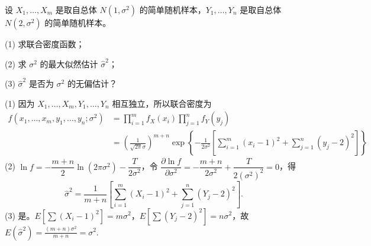 \documentclass[lang=cn,11pt]{elegantbook}
\begin{document}
\begin{exercise}\label{exer:7-two-normal-mle}
设 \(X_1, \dots, X_m\) 是取自总体 \(N(1, \sigma^2)\) 的简单随机样本，\(Y_1, \dots, Y_n\) 是取自总体 \(N(2, \sigma^2)\) 的简单随机样本。\par
(1) 求联合密度函数；\par
(2) 求 \(\sigma^2\) 的最大似然估计 \(\hat{\sigma}^2\)；\par
(3) \(\hat{\sigma}^2\) 是否为 \(\sigma^2\) 的无偏估计？
\end{exercise}
\begin{solution}
(1) 因为 \(X_1,\dots,X_m,Y_1,\dots,Y_n\) 相互独立，所以联合密度为
\[
\begin{aligned}
f(x_1,\dots,x_m,y_1,\dots,y_n;\sigma^2)
&=\prod_{i=1}^m f_X(x_i)\prod_{j=1}^n f_Y(y_j)\\
&=\left(\frac1{\sqrt{2\pi}\sigma}\right)^{m+n}
\exp\left\{-\frac{1}{2\sigma^2}
\left[\sum_{i=1}^m(x_i-1)^2+\sum_{j=1}^n(y_j-2)^2\right]\right\}
\end{aligned}
\]
(2) \(\ln f = -\dfrac{m+n}{2}\ln(2\pi\sigma^2) - \dfrac{T}{2\sigma^2}\)，令 \(\dfrac{\partial\ln f}{\partial\sigma^2} = -\dfrac{m+n}{2\sigma^2}+\dfrac{T}{2(\sigma^2)^2}=0\)，得
\[
\hat{\sigma}^2 = \frac{1}{m+n}\!\left[\sum_{i=1}^{m}(X_i-1)^2+\sum_{j=1}^{n}(Y_j-2)^2\right].
\]
(3) 是。\(E\!\left[\sum(X_i-1)^2\right] = m\sigma^2\)，\(E\!\left[\sum(Y_j-2)^2\right] = n\sigma^2\)，故
\(
E(\hat{\sigma}^2) = \frac{(m+n)\sigma^2}{m+n} = \sigma^2. 
\)
\end{solution}
\end{document}
